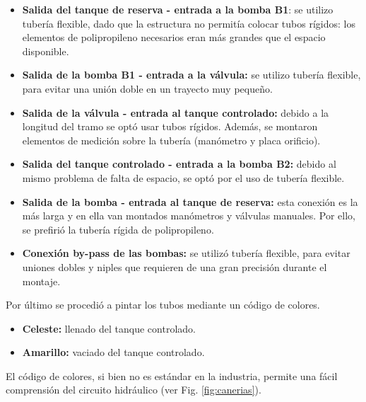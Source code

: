 \begin{itemize}
  \item \textbf{Salida del tanque de reserva - entrada a la bomba B1}:
  se utilizo tubería flexible, dado que la estructura no permitía colocar tubos
  rígidos: los elementos de polipropileno necesarios eran más grandes que el
  espacio disponible.

  \item \textbf{Salida de la bomba B1 - entrada a la válvula:}
  se utilizo tubería flexible, para evitar una unión doble en un trayecto muy
  pequeño.
  
  \item \textbf{Salida de la válvula - entrada al tanque controlado:}
  debido a la longitud del tramo se optó usar tubos rígidos.
  Además, se montaron elementos de medición sobre la tubería (manómetro y
  placa orificio).
  
  \item \textbf{Salida del tanque controlado - entrada a la bomba B2:}
  debido al mismo problema de falta de espacio, se optó por el uso de tubería
  flexible.
  
  \item \textbf{Salida de la bomba - entrada al tanque de reserva:}
  esta conexión es la más larga y en ella van montados manómetros y
  válvulas manuales. Por ello, se prefirió la tubería rígida de polipropileno.

  \item \textbf{Conexión by-pass de las bombas:}
  se utilizó tubería flexible, para evitar uniones dobles y
  niples que requieren de una gran precisión durante el montaje.
 \end{itemize}

Por último se procedió a pintar los tubos mediante un código de colores.
 \begin{itemize}
  \item {\color{Cerulean} \textbf{Celeste:}} llenado del tanque controlado.
  \item {\color{YellowOrange} \textbf{Amarillo:}} vaciado del tanque controlado.
 \end{itemize}
El código de colores, si bien no es estándar en la industria, permite una fácil
comprensión del circuito hidráulico (ver Fig. \ref{fig:canerias}).

